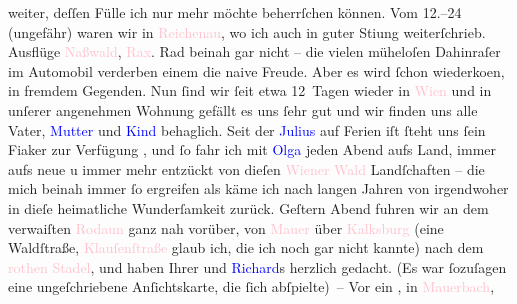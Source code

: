                weiter, deſſen Fülle ich nur mehr möchte beherrſchen können. Vom
                  12.–24 (ungefähr) waren wir in \textcolor{pink}{Reichenau}{}\ledrightnote{\textcolor{pink}{Reichenau an der Rax}}, wo ich auch in guter Sti{\geminationm}ung weiterſchrieb. Ausflüge \textcolor{pink}{Naßwald}{}\ledrightnote{\textcolor{pink}{Nasswald}}, \textcolor{pink}{Rax}{}\ledrightnote{\textcolor{pink}{Rax}}. Rad beinah gar nicht – die vielen müheloſen
               Dahinraſer im Automobil verderben einem die naive Freude. Aber es wird ſchon
                  wiederko{\geminationm}en, in fremdem Gegenden.\pend
           \pstart
           Nun ſind wir ſeit etwa 12 Tagen wieder in \textcolor{pink}{Wien}{}\ledrightnote{\textcolor{pink}{Wien}} und in
               unſerer {\pb}angenehmen Wohnung gefällt es uns ſehr gut und
               wir finden uns alle Vater, \textcolor{blue}{Mutter}{} und \textcolor{blue}{Kind}{}
               behaglich. Seit der \textcolor{blue}{Julius}{}\ledrightnote{\textcolor{blue}{Julius Schnitzler}} auf Ferien iſt ſteht
               uns ſein Fiaker zur Verfügung , und ſo fahr ich
               mit \textcolor{blue}{Olga}{}\ledrightnote{\textcolor{blue}{Olga Schnitzler}} jeden Abend aufs Land, immer aufs neue u
               immer mehr entzückt von dieſen \textcolor{pink}{Wiener Wald}{}\ledrightnote{\textcolor{pink}{Wienerwald}}
               Landſchaften – die mich beinah immer ſo ergreifen als käme ich nach langen Jahren von
               irgendwoher in dieſe heimatliche Wunderſamkeit zurück. Geſtern Abend fuhren wir an
               dem verwaiſten \textcolor{pink}{Ro{\pb}daun}{}\ledrightnote{\textcolor{pink}{Rodaun}}
               ganz nah vorüber, von \textcolor{pink}{Mauer}{}\ledrightnote{\textcolor{pink}{Mauer}} über \textcolor{pink}{Kalksburg}{}\ledrightnote{\textcolor{pink}{Kalksburg}} (eine Waldſtraße, \textcolor{pink}{Klauſenſtraße}{}\ledrightnote{\textcolor{pink}{Kalksburger Straße}} glaub ich, die ich noch gar nicht kannte) nach dem \textcolor{pink}{rothen Stadel}{}\ledrightnote{\textcolor{pink}{Der rothe Stadl}}, und haben Ihrer und \textcolor{blue}{Richard}{}\ledrightnote{\textcolor{blue}{Richard Beer-Hofmann}}s herzlich gedacht. (Es war ſozuſagen eine
               ungeſchriebene Anſichtskarte, die ſich abſpielte) –\pend
           \pstart
           Vor ein \label{K_L01422_2v}\label{K_L01422_2h}, in \textcolor{pink}{Mauerbach}{}\ledrightnote{\textcolor{pink}{Mauerbach}},
